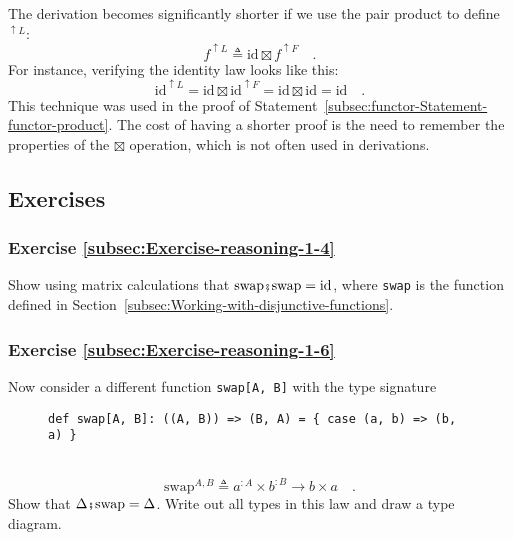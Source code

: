 The derivation becomes significantly shorter if we use the pair product
to define $^{\uparrow L}$:
\[
f^{\uparrow L}\triangleq\text{id}\boxtimes f^{\uparrow F}\quad.
\]
For instance, verifying the identity law looks like this:
\[
\text{id}^{\uparrow L}=\text{id}\boxtimes\text{id}^{\uparrow F}=\text{id}\boxtimes\text{id}=\text{id}\quad.
\]
This technique was used in the proof of Statement~\ref{subsec:functor-Statement-functor-product}.
The cost of having a shorter proof is the need to remember the properties
of the $\boxtimes$ operation, which is not often used in derivations.

\subsection{Exercises}

\subsubsection{Exercise \label{subsec:Exercise-reasoning-1-4}\ref{subsec:Exercise-reasoning-1-4}}

Show using matrix calculations that $\text{swap}\bef\text{swap}=\text{id}$,
where \lstinline!swap! is the function defined in Section~\ref{subsec:Working-with-disjunctive-functions}.

\subsubsection{Exercise \label{subsec:Exercise-reasoning-1-6}\ref{subsec:Exercise-reasoning-1-6}}

Now consider a different function \lstinline!swap[A, B]! with the
type signature

\begin{wrapfigure}{L}{0.63\columnwidth}%
\vspace{-0.65\baselineskip}
\begin{lstlisting}
def swap[A, B]: ((A, B)) => (B, A) = { case (a, b) => (b, a) }
\end{lstlisting}

\vspace{-0.25\baselineskip}
\end{wrapfigure}%

~\vspace{-1.25\baselineskip}
\[
\text{swap}^{A,B}\triangleq a^{:A}\times b^{:B}\rightarrow b\times a\quad.
\]
\vspace{-0.15\baselineskip}
Show that $\Delta\bef\text{swap}=\Delta$. Write out all types in
this law and draw a type diagram.

